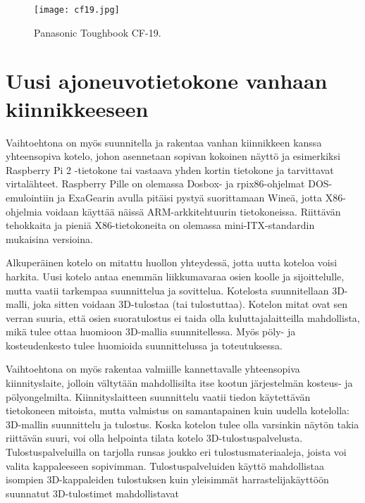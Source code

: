 \begin{figure}[H]
\centering
\texttt{[image: cf19.jpg]}
\caption{Panasonic Toughbook CF-19.}
\label{kuva_cf19}
\end{figure}

\section{Uusi ajoneuvotietokone vanhaan kiinnikkeeseen}
Vaihtoehtona on myös suunnitella ja rakentaa vanhan kiinnikkeen kanssa yhteensopiva kotelo, johon asennetaan sopivan kokoinen näyttö ja esimerkiksi Raspberry Pi 2 -tietokone tai vastaava yhden kortin tietokone ja tarvittavat virtalähteet. Raspberry Pille on olemassa Dosbox- ja rpix86-ohjelmat DOS-emulointiin ja ExaGearin avulla pitäisi pystyä suorittamaan Wineä, jotta X86-ohjelmia voidaan käyttää näissä ARM-arkkitehtuurin tietokoneissa. Riittävän tehokkaita ja pieniä X86-tietokoneita on olemassa mini-ITX-standardin mukaisina versioina.

Alkuperäinen kotelo on mitattu huollon yhteydessä, jotta uutta koteloa voisi harkita. Uusi kotelo antaa enemmän liikkumavaraa osien koolle ja sijoittelulle, mutta vaatii tarkempaa suunnittelua ja sovittelua. Kotelosta suunnitellaan 3D-malli, joka sitten voidaan 3D-tulostaa (tai tulostuttaa). Kotelon mitat ovat sen verran suuria, että osien suoratulostus ei taida olla kuluttajalaitteilla mahdollista, mikä tulee ottaa huomioon 3D-mallia suunnitellessa. Myös pöly- ja kosteudenkesto tulee huomioida suunnittelussa ja toteutuksessa.

Vaihtoehtona on myös rakentaa valmiille kannettavalle yhteensopiva kiinnityslaite, jolloin vältytään mahdollisilta itse kootun järjestelmän kosteus- ja pölyongelmilta. Kiinnityslaitteen suunnittelu vaatii tiedon käytettävän tietokoneen mitoista, mutta valmistus on samantapainen kuin uudella kotelolla: 3D-mallin suunnittelu ja tulostus. Koska kotelon tulee olla varsinkin näytön takia riittävän suuri, voi olla helpointa tilata kotelo 3D-tulostuspalvelusta. Tulostuspalveluilla on tarjolla runsas joukko eri tulostusmateriaaleja, joista voi valita kappaleeseen sopivimman. Tulostuspalveluiden käyttö mahdollistaa isompien 3D-kappaleiden tulostuksen kuin yleisimmät harrastelijakäyttöön suunnatut 3D-tulostimet mahdollistavat \citep{3d_shapeways, 3d_ultimaker}



